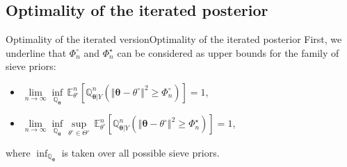 \documentclass[10pt]{beamer}
\begin{document}
\subsection{Optimality of the iterated posterior}
\begin{frame}{Optimality of the iterated version}{Optimality of the iterated posterior}
First, we underline that $\Phi_{n}^{\circ}$ and $\Phi_{n}^{\star}$ can be considered as upper bounds for the family of sieve priors:
\begin{itemize}
\item $\lim\limits_{n \rightarrow \infty} \inf\limits_{\mathbb{Q}_{\boldsymbol{\theta}}}\, \mathbb{E}_{\theta^{\circ}}^{n}\left[\mathbb{Q}_{\boldsymbol{\theta} \vert Y}^{n}\left(\left\Vert \boldsymbol{\theta} - \theta^{\circ} \right\Vert^{2} \geq \Phi_{n}^{\circ}\right)\right] = 1$,
\item $\lim\limits_{n \rightarrow \infty} \inf\limits_{\mathbb{Q}_{\boldsymbol{\theta}}}\sup\limits_{\theta^{\circ} \in \Theta^{\circ}}\, \mathbb{E}_{\theta^{\circ}}^{n}\left[\mathbb{Q}_{\boldsymbol{\theta} \vert Y}^{n}\left(\left\Vert \boldsymbol{\theta} - \theta^{\circ} \right\Vert^{2} \geq \Phi_{n}^{\star}\right)\right] = 1$,
\end{itemize}
where $\inf_{\mathbb{Q}_{\boldsymbol{\theta}}}$ is taken over all possible sieve priors.
\end{frame}
\end{document}
